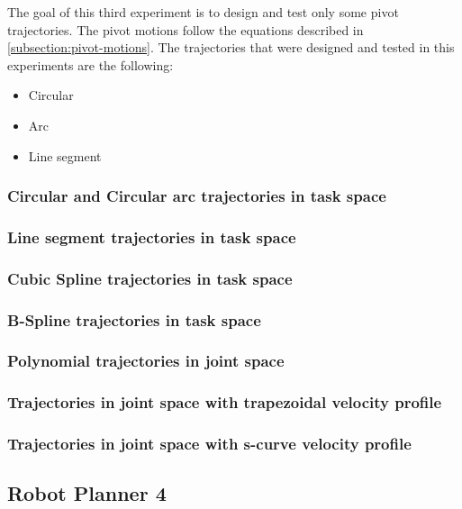 The goal of this third experiment is to design and test only some pivot trajectories. The pivot motions follow the equations described in 
\ref{subsection:pivot-motions}. The trajectories that were designed and tested in this experiments are the following:
\begin{itemize}
\item Circular
\item Arc
\item Line segment
\end{itemize}

\subsubsection{Circular and Circular arc trajectories in task space}

\subsubsection{Line segment trajectories in task space}

\subsubsection{Cubic Spline trajectories in task space}

\subsubsection{B-Spline trajectories in task space}

\subsubsection{Polynomial trajectories in joint space}

\subsubsection{Trajectories in joint space with trapezoidal velocity profile}

\subsubsection{Trajectories in joint space with s-curve velocity profile}

\subsection{Robot Planner 4}

